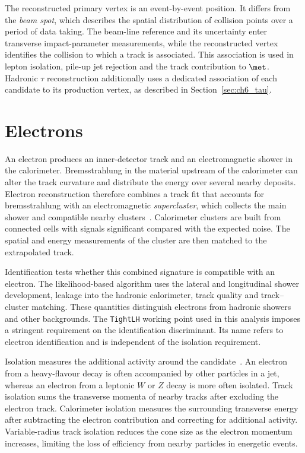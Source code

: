 The reconstructed primary vertex is an event-by-event position.
It differs from the \emph{beam spot}, which describes the spatial distribution of collision points over a period of data taking.
The beam-line reference and its uncertainty enter transverse impact-parameter measurements, while the reconstructed vertex identifies the collision to which a track is associated.
This association is used in lepton isolation, pile-up jet rejection and the track contribution to $\met$.
Hadronic $\tau$ reconstruction additionally uses a dedicated association of each candidate to its production vertex, as described in Section~\ref{sec:ch6_tau}.

\section{Electrons}
\label{sec:ch6_electrons}

An electron produces an inner-detector track and an electromagnetic shower in the calorimeter.
Bremsstrahlung in the material upstream of the calorimeter can alter the track curvature and distribute the energy over several nearby deposits.
Electron reconstruction therefore combines a track fit that accounts for bremsstrahlung with an electromagnetic \emph{supercluster}, which collects the main shower and compatible nearby clusters~\cite{ATLAS2019ElectronReco}.
Calorimeter clusters are built from connected cells with signals significant compared with the expected noise.
The spatial and energy measurements of the cluster are then matched to the extrapolated track.

Identification tests whether this combined signature is compatible with an electron.
The likelihood-based algorithm uses the lateral and longitudinal shower development, leakage into the hadronic calorimeter, track quality and track--cluster matching.
These quantities distinguish electrons from hadronic showers and other backgrounds.
The \texttt{TightLH} working point used in this analysis imposes a stringent requirement on the identification discriminant.
Its name refers to electron identification and is independent of the isolation requirement.

Isolation measures the additional activity around the candidate~\cite{ATLAS2019ElectronPerformance}.
An electron from a heavy-flavour decay is often accompanied by other particles in a jet, whereas an electron from a leptonic $W$ or $Z$ decay is more often isolated.
Track isolation sums the transverse momenta of nearby tracks after excluding the electron track.
Calorimeter isolation measures the surrounding transverse energy after subtracting the electron contribution and correcting for additional activity.
Variable-radius track isolation reduces the cone size as the electron momentum increases, limiting the loss of efficiency from nearby particles in energetic events.

